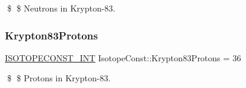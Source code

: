 \$ \$ Neutrons in Krypton-\/83. \mbox{\label{group___isotope_const-_krypton-_kr83_ga562f786a690062da46759763ae6a76b6}} 
\subsubsection{\texorpdfstring{Krypton83\+Protons}{Krypton83Protons}}
{\footnotesize\ttfamily \mbox{\hyperlink{group___isotope_const-_macros_ga5f18360b3e99483a35c32d789e62621c}{I\+S\+O\+T\+O\+P\+E\+C\+O\+N\+S\+T\+\_\+\+I\+NT}} Isotope\+Const\+::\+Krypton83\+Protons = 36}

\$ \$ Protons in Krypton-\/83. 
